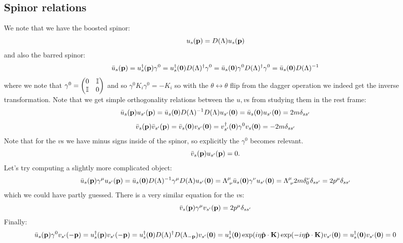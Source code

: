 \subsection{Spinor relations}
We note that we have the boosted spinor:
\begin{equation}
    u_s(\mathbf{p}) = D(\Lambda)u_s(\mathbf{p})
\end{equation}
and also the barred spinor:
\begin{equation}
    \bar{u}_s(\mathbf{p}) = u_s^\dagger(\mathbf{p})\gamma^0 = u_s^\dagger(\mathbf{0})D(\Lambda)^\dagger \gamma^0 = \bar{u}_s(\mathbf{0})\gamma^0D(\Lambda)^\dagger \gamma^0 = \bar{u}_s(\mathbf{0}) D(\Lambda)^{-1}
\end{equation}
where we note that $\gamma^0 = \begin{pmatrix}0 & \mathbb{I} \\ \mathbb{I} & 0\end{pmatrix}$ and so $\gamma^0 K_i \gamma^0 = -K_i$ so with the $\theta \leftrightarrow \theta$ flip from the dagger operation we indeed get the inverse transformation. Note that we get simple orthogonality relations between the $u, v$s from studying them in the rest frame:
\begin{equation}
    \bar{u}_s(\mathbf{p})u_{s'}(\mathbf{p}) = \bar{u}_s(\mathbf{0})D(\Lambda)^{-1}D(\Lambda)u_{s'}(\mathbf{0}) = \bar{u}_s(\mathbf{0})u_{s'}(\mathbf{0}) = 2m\delta_{ss'}
\end{equation}
\begin{equation}
    \bar{v}_s(\mathbf{p})\bar{v}_{s'}(\mathbf{p}) = \bar{v}_s(\mathbf{0})v_{s'}(\mathbf{0}) = v_{s'}^\dagger(\mathbf{0})\gamma^0v_s(\mathbf{0}) = -2m\delta_{ss'}
\end{equation}
Note that for the $v$s we have minus signs inside of the spinor, so explicitly the $\gamma^0$ becomes relevant.
\begin{equation}
    \bar{v}_s(\mathbf{p})u_{s'}(\mathbf{p}) = 0.
\end{equation}
Let's try computing a slightly more complicated object:
\begin{equation}
    \bar{u}_s(\v{p})\gamma^\mu u_{s'}(\v{p}) = \bar{u}_s(\v{0})D(\Lambda)^{-1}\gamma^\mu D(\Lambda)u_{s'}(\v{0}) = \Lambda^{\mu}_{\sp\nu}\bar{u}_s(\v{0})\gamma^\nu u_{s'}(\v{0}) = \Lambda^{\mu}_{\sp\nu}2m\delta^{\nu}_0 \delta_{ss'} = 2p^\mu \delta_{ss'}
\end{equation}
which we could have partly guessed. There is a very similar equation for the $v$s:
\begin{equation}
    \bar{v}_s(\mathbf{p})\gamma^\mu v_{s'}(\mathbf{p}) = 2p^\mu \delta_{ss'}
\end{equation}
Finally:
\begin{equation}
    \bar{u}_s(\mathbf{p})\gamma^0 v_{s'}(-\mathbf{p}) = u_s^\dagger(\mathbf{p})v_{s'}(-\mathbf{p}) = u_s^\dagger (\mathbf{0})D(\Lambda)^\dagger D(\Lambda_{-\mathbf{p}})v_{s'}(\mathbf{0}) = u_s^\dagger (\mathbf{0})\exp(i\eta\hat{\mathbf{p}} \cdot \mathbf{K})\exp(-i\eta\hat{\mathbf{p}} \cdot \mathbf{K})v_{s'}(\mathbf{0}) = u_s^\dagger (\mathbf{0})v_{s'}(\mathbf{0})= 0
\end{equation}


